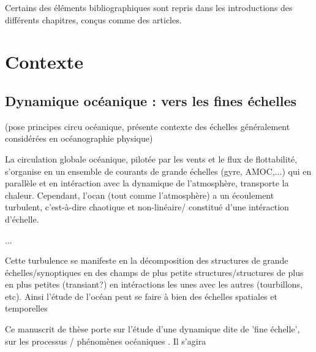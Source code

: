 

Certains des éléments bibliographiques sont repris dans les introductions des différents chapitres, conçus comme des articles.

\section{Contexte}
\subsection{Dynamique océanique : vers les fines échelles}
(pose principes circu océanique, présente contexte des échelles généralement considérées en océanographie physique)

La circulation globale océanique, pilotée par les vents et le flux de flottabilité, s'organise en un ensemble de courants de grande échelles (gyre, AMOC,...) qui en parallèle et en intéraction avec la dynamique de l'atmosphère, transporte la chaleur. Cependant, l'ocan (tout comme l'atmosphère) a un écoulement turbulent, c'est-à-dire chaotique et non-linéaire/ constitué d'une intéraction d'échelle.

...

Cette turbulence se manifeste en la décomposition des structures de grande échelles/synoptiques en des champs de plus petite structures/structures de plus en plus petites (transiant?) en intéractions les unes avec les autres (tourbillons, etc). Ainsi l'étude de l'océan peut se faire à bien des échelles spatiales et temporelles

Ce manuscrit de thèse porte sur l'étude d'une dynamique dite de 'fine échelle', sur les processus / phénomènes océaniques . Il s'agira 

